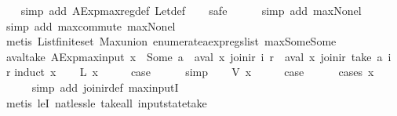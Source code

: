 \begin{isabellebody}
%
\isadelimproof
\ \ %
\endisadelimproof
%
\isatagproof
{}\isamarkupfalse%
\ {\isacharparenleft}simp\ add{\isacharcolon}\ AExp{\isachardot}max{\isacharunderscore}reg{\isacharunderscore}def\ Let{\isacharunderscore}def{\isacharparenright}\isanewline
\ \ \isamarkupfalse%
\ safe\isanewline
\ \ \ \ \isamarkupfalse%
\ {\isacharparenleft}simp\ add{\isacharcolon}\ max{\isacharunderscore}None{\isacharunderscore}l{\isacharparenright}\isanewline
\ \ \ \isamarkupfalse%
\ {\isacharparenleft}simp\ add{\isacharcolon}\ max{\isachardot}commute\ max{\isacharunderscore}None{\isacharunderscore}l{\isacharparenright}\isanewline
\ \ \isamarkupfalse%
\ {\isacharparenleft}metis\ List{\isachardot}finite{\isacharunderscore}set\ Max{\isachardot}union\ enumerate{\isacharunderscore}aexp{\isacharunderscore}regs{\isacharunderscore}list\ max{\isacharunderscore}Some{\isacharunderscore}Some{\isacharparenright}%
\endisatagproof
{\isafoldproof}%
%
\isadelimproof
\isanewline
%
\endisadelimproof
\isanewline
{}\isamarkupfalse%
\ aval{\isacharunderscore}take{\isacharcolon}\ {\isachardoublequoteopen}AExp{\isachardot}max{\isacharunderscore}input\ x\ {\isacharless}\ Some\ a\ {\isasymLongrightarrow}\ aval\ x\ {\isacharparenleft}join{\isacharunderscore}ir\ i\ r{\isacharparenright}\ {\isacharequal}\ aval\ x\ {\isacharparenleft}join{\isacharunderscore}ir\ {\isacharparenleft}take\ a\ i{\isacharparenright}\ r{\isacharparenright}{\isachardoublequoteclose}\isanewline
%
\isadelimproof
%
\endisadelimproof
%
\isatagproof
{}\isamarkupfalse%
{\isacharparenleft}induct\ x{\isacharparenright}\isanewline
\ \ \isamarkupfalse%
\ {\isacharparenleft}L\ x{\isacharparenright}\isanewline
\ \ \isamarkupfalse%
\ \isamarkupfalse%
\ {\isacharquery}case\isanewline
\ \ \ \ \isamarkupfalse%
\ simp\isanewline
{}\isamarkupfalse%
\isanewline
\ \ \isamarkupfalse%
\ {\isacharparenleft}V\ x{\isacharparenright}\isanewline
\ \ \isamarkupfalse%
\ \isamarkupfalse%
\ {\isacharquery}case\isanewline
\ \ \ \ \isamarkupfalse%
\ {\isacharparenleft}cases\ x{\isacharparenright}\isanewline
\ \ \ \ \isamarkupfalse%
\ {\isacharparenleft}simp\ add{\isacharcolon}\ join{\isacharunderscore}ir{\isacharunderscore}def\ max{\isacharunderscore}input{\isacharunderscore}I{\isacharparenright}\isanewline
\ \ \ \ \isamarkupfalse%
\ {\isacharparenleft}metis\ leI\ nat{\isacharunderscore}less{\isacharunderscore}le\ take{\isacharunderscore}all\ input{}state{\isacharunderscore}take{\isacharparenright}\isanewline

\end{isabellebody}
